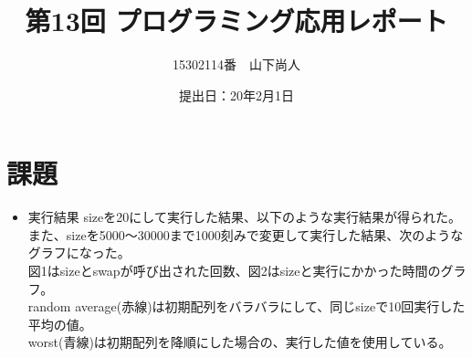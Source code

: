 \documentclass[a4paper]{jsarticle}
\title{第13回 プログラミング応用レポート}
\author{15302114番　山下尚人}
\date{提出日：20年2月1日}
\begin{document}
\maketitle%

\section*{課題}
	\begin{itemize}
	\item 実行結果
		sizeを20にして実行した結果、以下のような実行結果が得られた。\\
		
		 
		
		また、sizeを5000〜30000まで1000刻みで変更して実行した結果、次のようなグラフになった。\\
		図1はsizeとswapが呼び出された回数、図2はsizeと実行にかかった時間のグラフ。\\
		random average(赤線)は初期配列をバラバラにして、同じsizeで10回実行した平均の値。\\
		worst(青線)は初期配列を降順にした場合の、実行した値を使用している。
		

\end{itemize}
\end{document}
